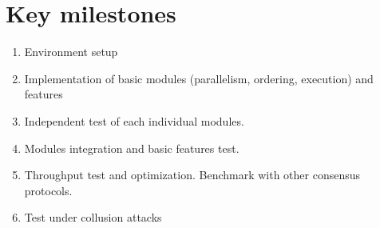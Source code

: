 
\section{Key milestones}
\begin{enumerate}
    \item Environment setup
    \item Implementation of basic modules (parallelism, ordering, execution) and features
    \item Independent test of each individual modules.
    \item Modules integration and basic features test.
    \item Throughput test and optimization. Benchmark with other consensus protocols.
    \item Test under collusion attacks
\end{enumerate}